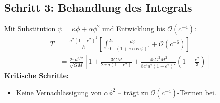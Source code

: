 \subsection*{Schritt 3: Behandlung des Integrals}
Mit Substitution \(\psi = \kappa\phi + \alpha\phi^2\) und Entwicklung bis \(\mathcal{O}(c^{-4})\):
\begin{align}
T &= \frac{a^2(1-e^2)^2}{h} \left[ \int_0^{2\pi} \frac{d\phi}{(1 + e\cos\psi)^2} + \mathcal{O}(c^{-6}) \right] \\
  &= \frac{2\pi a^{3/2}}{\sqrt{GM}} \left[1 + \frac{3GM}{2c^2a(1-e^2)} + \frac{45G^2M^2}{8c^4a^2(1-e^2)^2}\left(1 - \frac{e^2}{3}\right)\right]
\end{align}
\textbf{Kritische Schritte:}
\begin{itemize}
\item Keine Vernachlässigung von \(\alpha\phi^2\) – trägt zu \(\mathcal{O}(c^{-4})\)-Termen bei.
\end{itemize}
